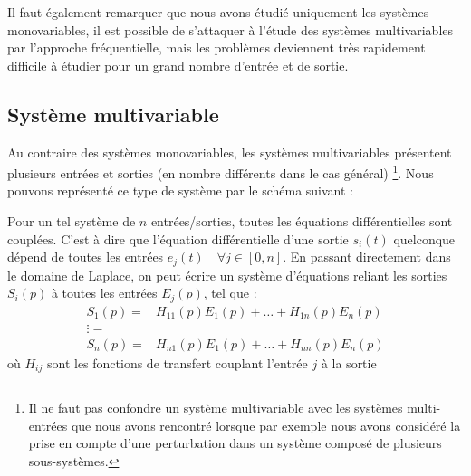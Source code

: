 Il faut également remarquer que nous avons étudié uniquement les systèmes
monovariables, il est possible de s'attaquer à l'étude des systèmes 
multivariables par l'approche fréquentielle, mais les problèmes deviennent
très rapidement difficile à étudier pour un grand nombre d'entrée et de sortie.   
\subsection{Système multivariable}
Au contraire des systèmes monovariables, les systèmes multivariables présentent
plusieurs entrées et sorties (en nombre différents dans le cas général)
\footnote{Il ne faut pas confondre un système
multivariable avec les systèmes multi-entrées que nous avons rencontré lorsque
par exemple nous avons considéré la prise en compte d'une perturbation dans
un système composé de plusieurs sous-systèmes.}. Nous pouvons représenté ce 
type de système par le schéma suivant :
\begin{center}
    
\end{center}
Pour un tel système de $n$ entrées/sorties, 
toutes les équations différentielles sont couplées. 
C'est à dire que l'équation différentielle d'une sortie $s_i(t)$ quelconque 
dépend de toutes les entrées $e_j(t)\quad\forall j\in[0,n]$. En passant 
directement dans le domaine de 
Laplace, on peut écrire un système d'équations reliant les sorties $S_i(p)$ 
à toutes les entrées $E_j(p)$, tel que  :
\begin{align*}
    S_1(p) =& H_{11}(p) E_1(p) + \ldots + H_{1n}(p) E_n(p) \\
    \vdots =& \\ 
    S_n(p) =& H_{n1}(p) E_1(p) + \ldots + H_{nn}(p) E_n(p)
\end{align*}
où $H_{ij}$ sont les fonctions de transfert couplant l'entrée $j$ à la sortie 
